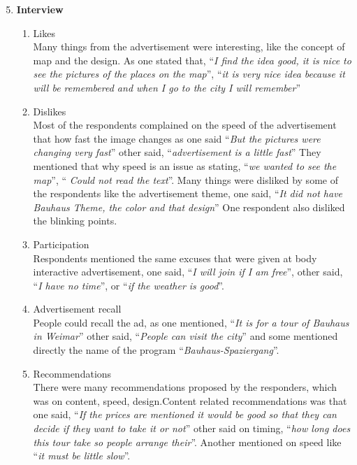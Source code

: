 \begin{enumerate}
\setcounter{enumi}{4}

\item \textbf{Interview} 
\begin{enumerate}
\item Likes \\
Many things from the advertisement were interesting, like the concept of map and the design. As one stated that, ``\emph{I find the idea good, it is nice to see the pictures of the places on the map}'', ``\emph{it is very nice idea because it will be remembered and when I go to the city I will remember}''

\item Dislikes \\
Most of the respondents complained on the speed of the advertisement that how fast the image changes as one said ``\emph{But the pictures were changing very fast}'' other said, ``\emph{advertisement is a little fast}'' They mentioned that why speed is an issue as stating, ``\emph{we wanted to see the map}'', ``\emph{ Could not read the text}''. Many things were disliked by some of the respondents like the advertisement theme, one said, ``\emph{It did not have Bauhaus Theme, the color and that design}'' One respondent also disliked the blinking points.

\item  Participation \\
Respondents mentioned the same excuses that were given at body interactive advertisement, one said, ``\emph{I will join if I am free}'', other said, ``\emph{I have no time}'', or ``\emph{if the weather is good}''. 

\item  Advertisement recall \\
People could recall the ad, as one mentioned, ``\emph{It is for a tour of Bauhaus in Weimar}'' other said, ``\emph{People can visit the city}'' and some mentioned directly the name of the program ``\emph{Bauhaus-Spaziergang}''.

\item Recommendations \\
There were many recommendations proposed by the responders, which was on content, speed, design.Content related recommendations was that one said, ``\emph{If the prices are mentioned it would be good so that they can decide if they want to take it or not}'' other said on timing, ``\emph{how long does this tour take so people arrange their}''. Another mentioned on speed like ``\emph{it must be little slow}''.


\end{enumerate}
\end{enumerate}
